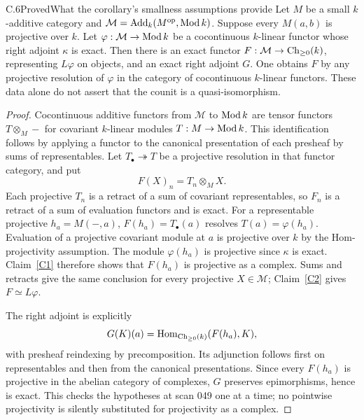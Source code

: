 \begin{claim}{C.6}{Proved}{What the corollary's smallness assumptions provide}\label{C6}
Let $M$ be a small $k$-additive category and $\mathcal M=\operatorname{Add}_k(M^{\mathrm{op}},\operatorname{Mod} k)$. Suppose every $M(a,b)$ is projective over $k$. Let $\varphi:\mathcal M\to\operatorname{Mod} k$ be a cocontinuous $k$-linear functor whose right adjoint $\kappa$ is exact. Then there is an exact functor $F:\mathcal M\to\operatorname{Ch}_{\geq0}(k)$, representing $L\varphi$ on objects, and an exact right adjoint $G$. One obtains $F$ by any projective resolution of $\varphi$ in the category of cocontinuous $k$-linear functors. These data alone do not assert that the counit is a quasi-isomorphism.
\end{claim}
\begin{proof}
Cocontinuous additive functors from $\mathcal M$ to $\operatorname{Mod} k$ are tensor functors $T\otimes_M-$ for covariant $k$-linear modules $T:M\to\operatorname{Mod} k$. This identification follows by applying a functor to the canonical presentation of each presheaf by sums of representables. Let $T_\bullet\twoheadrightarrow T$ be a projective resolution in that functor category, and put
\[
 F(X)_n=T_n\otimes_M X.
\]
Each projective $T_n$ is a retract of a sum of covariant representables, so $F_n$ is a retract of a sum of evaluation functors and is exact. For a representable projective $h_a=M(-,a)$, $F(h_a)=T_\bullet(a)$ resolves $T(a)=\varphi(h_a)$. Evaluation of a projective covariant module at $a$ is projective over $k$ by the Hom-projectivity assumption. The module $\varphi(h_a)$ is projective since $\kappa$ is exact. Claim~\ref{C1} therefore shows that $F(h_a)$ is projective as a complex. Sums and retracts give the same conclusion for every projective $X\in\mathcal M$; Claim~\ref{C2} gives $F\simeq L\varphi$.

The right adjoint is explicitly
\[
 G(K)(a)=\operatorname{Hom}_{\operatorname{Ch}_{\geq0}(k)}(F(h_a),K),
\]
with presheaf reindexing by precomposition. Its adjunction follows first on representables and then from the canonical presentations. Since every $F(h_a)$ is projective in the abelian category of complexes, $G$ preserves epimorphisms, hence is exact. This checks the hypotheses at scan 049 one at a time; no pointwise projectivity is silently substituted for projectivity as a complex.
\end{proof}

